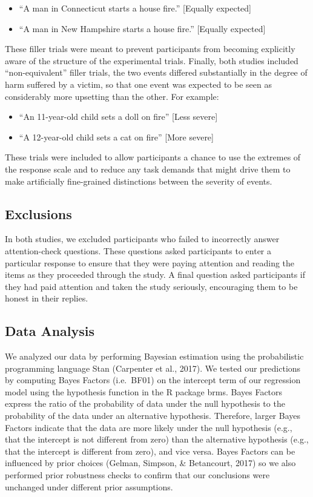 \documentclass[12pt,]{article}
\begin{document}
\begin{itemize}
\item
  ``A man in Connecticut starts a house fire.'' {[}Equally expected{]}
\item
  ``A man in New Hampshire starts a house fire.'' {[}Equally expected{]}
\end{itemize}

These filler trials were meant to prevent participants from becoming
explicitly aware of the structure of the experimental trials. Finally,
both studies included ``non-equivalent'' filler trials, the two events
differed substantially in the degree of harm suffered by a victim, so
that one event was expected to be seen as considerably more upsetting
than the other. For example:

\begin{itemize}
\item
  ``An 11-year-old child sets a doll on fire'' {[}Less severe{]}
\item
  ``A 12-year-old child sets a cat on fire'' {[}More severe{]}
\end{itemize}

These trials were included to allow participants a chance to use the
extremes of the response scale and to reduce any task demands that might
drive them to make artificially fine-grained distinctions between the
severity of events.

\subsection{Exclusions}\label{exclusions}

In both studies, we excluded participants who failed to incorrectly
answer attention-check questions. These questions asked participants to
enter a particular response to ensure that they were paying attention
and reading the items as they proceeded through the study. A final
question asked participants if they had paid attention and taken the
study seriously, encouraging them to be honest in their replies.

\subsection{Data Analysis}\label{data-analysis}

We analyzed our data by performing Bayesian estimation using the
probabilistic programming language Stan (Carpenter et al., 2017). We
tested our predictions by computing Bayes Factors (i.e.~BF01) on the
intercept term of our regression model using the hypothesis function in
the R package brms. Bayes Factors express the ratio of the probability
of data under the null hypothesis to the probability of the data under
an alternative hypothesis. Therefore, larger Bayes Factors indicate that
the data are more likely under the null hypothesis (e.g., that the
intercept is not different from zero) than the alternative hypothesis
(e.g., that the intercept is different from zero), and vice versa. Bayes
Factors can be influenced by prior choices (Gelman, Simpson, \&
Betancourt, 2017) so we also performed prior robustness checks to
confirm that our conclusions were unchanged under different prior
assumptions.
\end{document}
